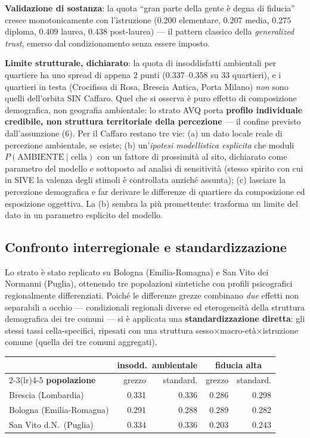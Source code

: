 \documentclass[11pt,a4paper]{article}
\begin{document}
\medskip\noindent\textbf{Validazione di sostanza}: la quota ``gran parte
della gente \`e degna di fiducia'' cresce monotonicamente con
l'istruzione ($0.200$ elementare, $0.207$ media, $0.275$ diploma,
$0.409$ laurea, $0.438$ post-laurea) --- il pattern classico della
\emph{generalized trust}, emerso dal condizionamento senza essere
imposto.

\medskip\noindent\textbf{Limite strutturale, dichiarato}: la quota di
insoddisfatti ambientali per quartiere ha uno spread di appena $2$ punti
($0.337$--$0.358$ su 33 quartieri), e i quartieri in testa
(Crocifissa di Rosa, Brescia Antica, Porta Milano) \emph{non} sono quelli
dell'orbita SIN Caffaro. Quel che si osserva \`e puro effetto di
composizione demografica, non geografia ambientale: lo strato AVQ porta
\textbf{profilo individuale credibile, non struttura territoriale della
percezione} --- il confine previsto dall'assunzione (6). Per il Caffaro
restano tre vie: (a) un dato locale reale di percezione ambientale, se
esiste; (b) un'\emph{ipotesi modellistica esplicita} che moduli
$P(\text{AMBIENTE}\mid\text{cella})$ con un fattore di prossimit\`a al
sito, dichiarato come parametro del modello e sottoposto ad analisi di
sensitivit\`a (stesso spirito con cui in SIVE la valenza degli stimoli
\`e controllata anzich\'e assunta); (c) lasciare la percezione
demografica e far derivare le differenze di quartiere da composizione ed
esposizione oggettiva. La (b) sembra la pi\`u promettente: trasforma un
limite del dato in un parametro esplicito del modello.

\subsection{Confronto interregionale e standardizzazione}
\label{sec:avq-std}
Lo strato \`e stato replicato su Bologna (Emilia-Romagna) e San Vito dei
Normanni (Puglia), ottenendo tre popolazioni sintetiche con profili
psicografici regionalmente differenziati. Poich\'e le differenze grezze
combinano \emph{due} effetti non separabili a occhio --- condizionali
regionali diverse ed eterogeneit\`a della struttura demografica dei tre
comuni --- si \`e applicata una \textbf{standardizzazione diretta}: gli
stessi tassi cella-specifici, ripesati con una struttura
sesso$\times$macro-et\`a$\times$istruzione comune (quella dei tre comuni
aggregati).

\begin{center}\small
\begin{tabular}{@{}lrrrr@{}}
\toprule
& \multicolumn{2}{c}{\textbf{insodd.\ ambientale}} & \multicolumn{2}{c}{\textbf{fiducia alta}}\\
\cmidrule(lr){2-3}\cmidrule(lr){4-5}
\textbf{popolazione} & grezzo & standard. & grezzo & standard.\\
\midrule
Brescia (Lombardia) & 0.331 & 0.336 & 0.286 & 0.298\\
Bologna (Emilia-Romagna) & 0.291 & 0.288 & 0.289 & 0.282\\
San Vito d.N.\ (Puglia) & 0.334 & 0.336 & 0.203 & 0.243\\
\bottomrule
\end{tabular}
\end{center}
\end{document}
